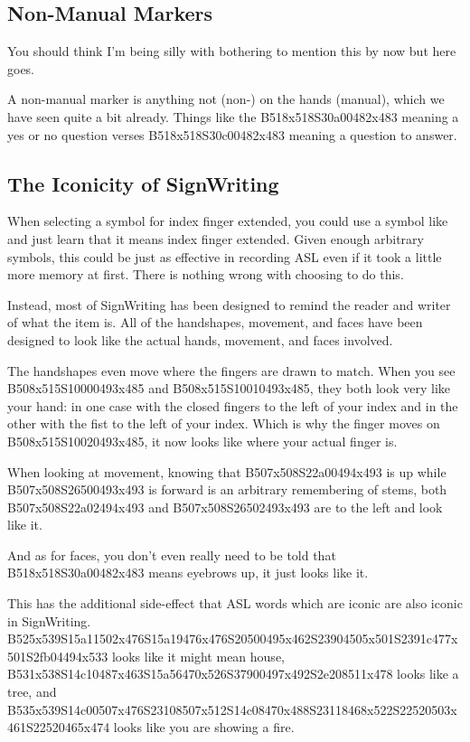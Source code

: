 \documentclass{article}
\begin{document}
\subsection{Non-Manual Markers}

You should think I'm being silly with bothering to mention this by now but here goes.

A non-manual marker is anything not (non-) on the hands (manual), which we have seen quite a bit already.
Things like the B518x518S30a00482x483 meaning a yes or no question verses B518x518S30c00482x483 meaning a question to answer.

\subsection{The Iconicity of SignWriting}

When selecting a symbol for index finger extended, you could use a symbol like  and just learn that it means index finger extended.
Given enough arbitrary symbols, this could be just as effective in recording ASL even if it took a little more memory at first.
There is nothing wrong with choosing to do this.

Instead, most of SignWriting has been designed to remind the reader and writer of what the item is.
All of the handshapes, movement, and faces have been designed to look like the actual hands, movement, and faces involved.

The handshapes even move where the fingers are drawn to match.
When you see B508x515S10000493x485 and B508x515S10010493x485, they both look very like your hand: in one case with the closed fingers to the left of your index and in the other with the fist to the left of your index.
Which is why the finger moves on B508x515S10020493x485, it now looks like where your actual finger is.

When looking at movement, knowing that B507x508S22a00494x493 is up while B507x508S26500493x493 is forward is an arbitrary remembering of stems, both B507x508S22a02494x493 and B507x508S26502493x493 are to the left and look like it.

And as for faces, you don't even really need to be told that B518x518S30a00482x483 means eyebrows up, it just looks like it.

This has the additional side-effect that ASL words which are iconic are also iconic in SignWriting.
B525x539S15a11502x476S15a19476x476S20500495x462S23904505x501S2391c477x501S2fb04494x533 looks like it might mean house, B531x538S14c10487x463S15a56470x526S37900497x492S2e208511x478 looks like a tree, and B535x539S14c00507x476S23108507x512S14c08470x488S23118468x522S22520503x461S22520465x474 looks like you are showing a fire.
\end{document}
